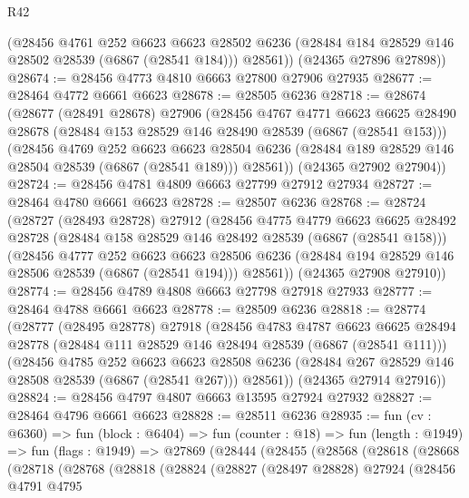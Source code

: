 \begin{lexlean}{R42}
\begin{coremodule}
{        (@28456
          @4761
          @252
          @6623
          @6623
          @28502
          @6236
          (@28484 @184 @28529 @146 @28502 @28539 (@6867 (@28541 @184)))
          @28561))
      (@24365 @27896 @27898))
@28674 := @28456 @4773 @4810 @6663 @27800 @27906 @27935
@28677 := @28464 @4772 @6661 @6623
@28678 := @28505 @6236
@28718 := @28674
    (@28677
      (@28491 @28678)
      @27906
      (@28456
        @4767
        @4771
        @6623
        @6625
        @28490
        @28678
        (@28484 @153 @28529 @146 @28490 @28539 (@6867 (@28541 @153)))
        (@28456
          @4769
          @252
          @6623
          @6623
          @28504
          @6236
          (@28484 @189 @28529 @146 @28504 @28539 (@6867 (@28541 @189)))
          @28561))
      (@24365 @27902 @27904))
@28724 := @28456 @4781 @4809 @6663 @27799 @27912 @27934
@28727 := @28464 @4780 @6661 @6623
@28728 := @28507 @6236
@28768 := @28724
    (@28727
      (@28493 @28728)
      @27912
      (@28456
        @4775
        @4779
        @6623
        @6625
        @28492
        @28728
        (@28484 @158 @28529 @146 @28492 @28539 (@6867 (@28541 @158)))
        (@28456
          @4777
          @252
          @6623
          @6623
          @28506
          @6236
          (@28484 @194 @28529 @146 @28506 @28539 (@6867 (@28541 @194)))
          @28561))
      (@24365 @27908 @27910))
@28774 := @28456 @4789 @4808 @6663 @27798 @27918 @27933
@28777 := @28464 @4788 @6661 @6623
@28778 := @28509 @6236
@28818 := @28774
    (@28777
      (@28495 @28778)
      @27918
      (@28456
        @4783
        @4787
        @6623
        @6625
        @28494
        @28778
        (@28484 @111 @28529 @146 @28494 @28539 (@6867 (@28541 @111)))
        (@28456
          @4785
          @252
          @6623
          @6623
          @28508
          @6236
          (@28484 @267 @28529 @146 @28508 @28539 (@6867 (@28541 @267)))
          @28561))
      (@24365 @27914 @27916))
@28824 := @28456 @4797 @4807 @6663 @13595 @27924 @27932
@28827 := @28464 @4796 @6661 @6623
@28828 := @28511 @6236
@28935 := fun (cv : @6360) =>
  fun (block : @6404) =>
  fun (counter : @18) =>
  fun (length : @1949) =>
  fun (flags : @1949) =>
  @27869
    (@28444
      (@28455
        (@28568
          (@28618
            (@28668
              (@28718
                (@28768
                  (@28818
                    (@28824
                      (@28827
                        (@28497 @28828)
                        @27924
                        (@28456
                          @4791
                          @4795
}
\end{coremodule}
\end{lexlean}
